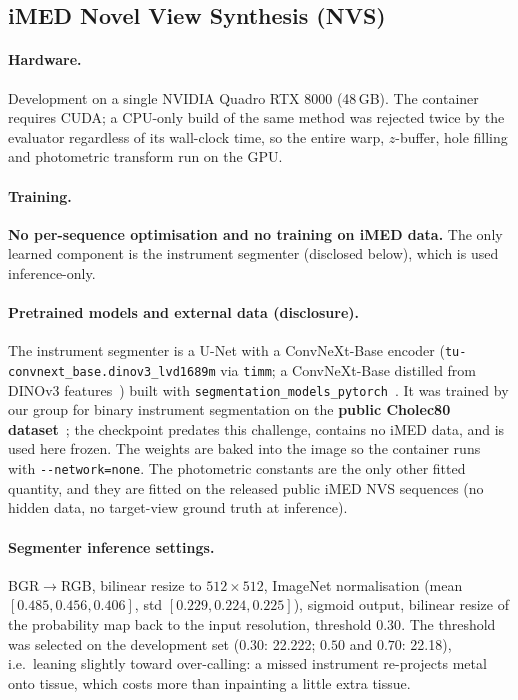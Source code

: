 \subsection{iMED Novel View Synthesis (NVS)}

\paragraph{Hardware.} Development on a single NVIDIA Quadro RTX 8000 (48\,GB). The container requires
CUDA; a CPU-only build of the same method was rejected twice by the evaluator regardless of its wall-clock
time, so the entire warp, $z$-buffer, hole filling and photometric transform run on the GPU.

\paragraph{Training.} \textbf{No per-sequence optimisation and no training on iMED data.} The only learned
component is the instrument segmenter (disclosed below), which is used inference-only.

\paragraph{Pretrained models and external data (disclosure).} The instrument segmenter is a U-Net with a
ConvNeXt-Base encoder (\texttt{tu-convnext\_base.dinov3\_lvd1689m} via \texttt{timm}; a ConvNeXt-Base
distilled from DINOv3 features~\cite{liu2022convnext,simeoni2025dinov3}) built with
\texttt{segmentation\_models\_pytorch}~\cite{iakubovskii2019smp}. It was trained by our group for binary
instrument segmentation on the \textbf{public Cholec80 dataset}~\cite{twinanda2017endonet}; the checkpoint
predates this challenge, contains no iMED data, and is used here frozen. The weights are baked into the
image so the container runs with \texttt{-{}-network=none}. The photometric constants are the only other
fitted quantity, and they are fitted on the released public iMED NVS sequences (no hidden data, no
target-view ground truth at inference).

\paragraph{Segmenter inference settings.} BGR$\rightarrow$RGB, bilinear resize to $512\times512$, ImageNet
normalisation (mean $[0.485,0.456,0.406]$, std $[0.229,0.224,0.225]$), sigmoid output, bilinear resize of
the probability map back to the input resolution, threshold $0.30$. The threshold was selected on the
development set ($0.30$: 22.222; $0.50$ and $0.70$: 22.18), i.e.\ leaning slightly toward over-calling: a
missed instrument re-projects metal onto tissue, which costs more than inpainting a little extra tissue.

